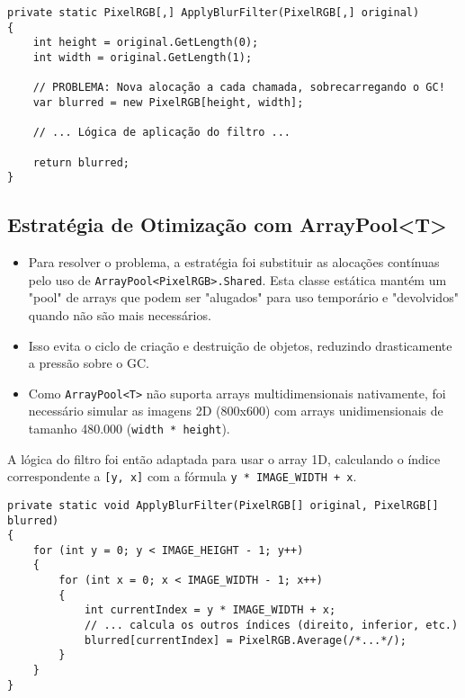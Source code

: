 \documentclass[
	12pt,
	oneside,
	a4paper,
	english,
	brazil,
]{abntex2}
\begin{document}
\begin{lstlisting}[caption={Ponto crítico de alocação na versão trivial.}]
private static PixelRGB[,] ApplyBlurFilter(PixelRGB[,] original)
{
    int height = original.GetLength(0);
    int width = original.GetLength(1);
    
    // PROBLEMA: Nova alocação a cada chamada, sobrecarregando o GC!
    var blurred = new PixelRGB[height, width];
    
    // ... Lógica de aplicação do filtro ...
    
    return blurred;
}
\end{lstlisting}

\subsection{Estratégia de Otimização com ArrayPool<T>}
\begin{itemize}
    \item Para resolver o problema, a estratégia foi substituir as alocações contínuas pelo uso de \texttt{ArrayPool<PixelRGB>.Shared}. Esta classe estática mantém um "pool" de arrays que podem ser "alugados" para uso temporário e "devolvidos" quando não são mais necessários.
    \item Isso evita o ciclo de criação e destruição de objetos, reduzindo drasticamente a pressão sobre o GC.
    \item Como \texttt{ArrayPool<T>} não suporta arrays multidimensionais nativamente, foi necessário simular as imagens 2D (800x600) com arrays unidimensionais de tamanho 480.000 (\texttt{width * height}).
\end{itemize}
A lógica do filtro foi então adaptada para usar o array 1D, calculando o índice correspondente a \texttt{[y, x]} com a fórmula \texttt{y * IMAGE\_WIDTH + x}.

\begin{lstlisting}[caption={Mapeamento de índice 2D para 1D no filtro otimizado.}]
private static void ApplyBlurFilter(PixelRGB[] original, PixelRGB[] blurred)
{
    for (int y = 0; y < IMAGE_HEIGHT - 1; y++)
    {
        for (int x = 0; x < IMAGE_WIDTH - 1; x++)
        {
            int currentIndex = y * IMAGE_WIDTH + x;
            // ... calcula os outros índices (direito, inferior, etc.)
            blurred[currentIndex] = PixelRGB.Average(/*...*/);
        }
    }
}
\end{lstlisting}
\end{document}
